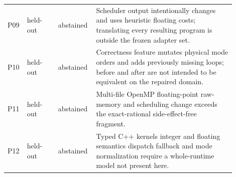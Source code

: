 \begin{longtable}{@{}p{0.055\linewidth}p{0.13\linewidth}p{0.13\linewidth}p{0.585\linewidth}@{}}
P09 & held-out & abstained & Scheduler output intentionally changes and uses heuristic floating costs; translating every resulting program is outside the frozen adapter set.\\
P10 & held-out & abstained & Correctness feature mutates physical mode orders and adds previously missing loops; before and after are not intended to be equivalent on the repaired domain.\\
P11 & held-out & abstained & Multi-file OpenMP floating-point raw-memory and scheduling change exceeds the exact-rational side-effect-free fragment.\\
P12 & held-out & abstained & Typed C++ kernels integer and floating semantics dispatch fallback and mode normalization require a whole-runtime model not present here.\\
\end{longtable}
